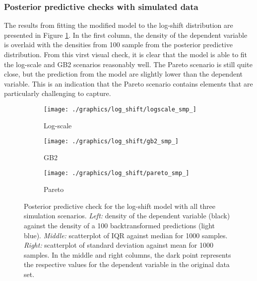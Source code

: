 \subsubsection{Posterior predictive checks with simulated data}
The results from fitting the modified model to the log-shift distribution are presented in Figure \ref{fig:ppc_logshift}.
In the first column, the density of the dependent variable is overlaid with the densities from 100 sample from the posterior predictive distribution.
From this virst visual check, it is clear that the model is able to fit the log-scale and GB2 scenarios reasonably well.
The Pareto scenario is still quite close, but the prediction from the model are slightly lower than the dependent variable.
This is an indication that the Pareto scenario contains elements that are particularly challenging to capture.


\begin{figure}
    \begin{subfigure}{\textwidth}
        \texttt{[image: ./graphics/log\_shift/logscale\_smp\_]}
        \caption{Log-scale}
    \end{subfigure}
    \newline
    \begin{subfigure}{\textwidth}
        \texttt{[image: ./graphics/log\_shift/gb2\_smp\_]}
        \caption{GB2}
    \end{subfigure}
    \newline
    \begin{subfigure}{\textwidth}
        \texttt{[image: ./graphics/log\_shift/pareto\_smp\_]}
        \caption{Pareto}
    \end{subfigure}
    \caption[Posterior predictive check for the log-shift model with all three simulation scenarios.]{Posterior predictive check for the log-shift model with all three simulation scenarios. \textit{Left:} density of the dependent variable (black) against the  density of a 100 backtransformed predictions (light blue). \textit{Middle:} scatterplot of IQR against median for 1000 samples. \textit{Right:} scatterplot of standard deviation against mean for 1000 samples. In the middle and right columns, the dark point represents the respective values for the dependent variable in the original data set.}
    \label{fig:ppc_logshift}
\end{figure}

